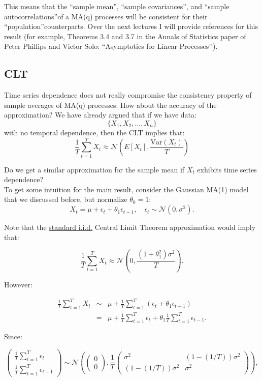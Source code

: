\documentclass[12] {article}
\begin{document}
\noindent This means that the ``sample mean\textquotedblright, ``sample covariances\textquotedblright, and  ``sample autocorrelations\textquotedblright\:of a MA(q) processes will be consistent for their ``population\textquotedblright \:counterparts. Over the next lectures I will provide references for this result (for example, Theorems 3.4 and 3.7 in the Annals of Statistics paper of Peter Phillips and Victor Solo: ``Asymptotics for Linear Processes’’). 

\newpage

\subsection{CLT}

Time series dependence does not really compromise the consistency property of sample averages of MA(q) processes. How about the accuracy of the approximation? We have already argued that if we have data:
\[ \{X_1, X_2, \ldots, X_n\} \]
with no temporal dependence, then the CLT implies that:
\[ \frac{1}{T} \sum_{t=1}^{T} X_t \approx \mathcal{N} \left( E[X_t] , \frac{\textrm{Var}(X_t)}{T} \right) \] 

\noindent Do we get a similar approximation for the sample mean if $X_t$ exhibits time series dependence? \\

To get some intuition for the main result, consider the Gaussian MA(1) model that we discussed before, but normalize $\theta_0=1$:
\[X_t =\mu + \epsilon_{t} + \theta_1 \epsilon_{t-1}, \quad \epsilon_t  \sim \mathcal{N}(0,\sigma^2). \]  

Note that the \underline{standard i.i.d.} Central Limit Theorem approximation would imply that:

\[ \frac{1}{T} \sum_{t=1}^{T} X_t \approx \mathcal{N} \left( 0 , \frac{(1+\theta_1^2)\sigma^2}{T} \right).\]

However:

\begin{eqnarray*}
\frac{1}{T} \sum_{t=1}^{T} X_t &\sim& \mu + \frac{1}{T} \sum_{t=1}^{T}  (\epsilon_t + \theta_1 \epsilon_{t-1})  \\
&=& \mu+  \frac{1}{T} \sum_{t=1}^{T} \epsilon_{t} + \theta_1 \frac{1}{T} \sum_{t=1}^{T} \epsilon_{t-1}.
\end{eqnarray*}
 
Since:

\[\begin{pmatrix} \frac{1}{T} \sum_{t=1}^{T} \epsilon_t \\ \frac{1}{T} \sum_{t=1}^{T} \epsilon_{t-1} \end{pmatrix} \sim \mathcal{N} \left( \begin{pmatrix} 0 \\ 0 \end{pmatrix}, \frac{1}{T} \begin{pmatrix} \sigma^2 & (1-(1/T)) \sigma^2  \\ (1-(1/T)) \sigma^2& \sigma^2 \end{pmatrix}  \right), \]
\end{document}
